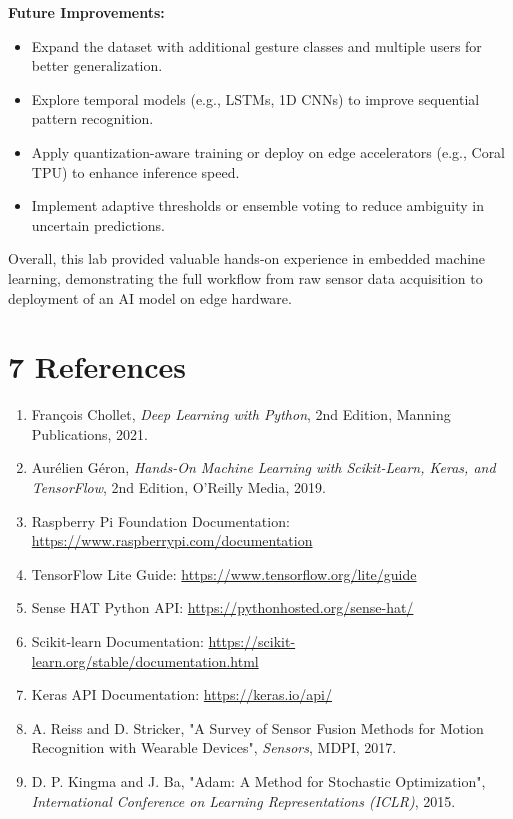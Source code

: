 \documentclass[a4paper,12pt]{article}
\begin{document}
\textbf{Future Improvements:}
\begin{itemize}
    \item Expand the dataset with additional gesture classes and multiple users for better generalization.
    \item Explore temporal models (e.g., LSTMs, 1D CNNs) to improve sequential pattern recognition.
    \item Apply quantization-aware training or deploy on edge accelerators (e.g., Coral TPU) to enhance inference speed.
    \item Implement adaptive thresholds or ensemble voting to reduce ambiguity in uncertain predictions.
\end{itemize}

Overall, this lab provided valuable hands-on experience in embedded machine learning, demonstrating the full workflow from raw sensor data acquisition to deployment of an AI model on edge hardware.

\section*{7 References}
\begin{enumerate}
    \item François Chollet, \textit{Deep Learning with Python}, 2nd Edition, Manning Publications, 2021.
    \item Aurélien Géron, \textit{Hands-On Machine Learning with Scikit-Learn, Keras, and TensorFlow}, 2nd Edition, O'Reilly Media, 2019.
    \item Raspberry Pi Foundation Documentation: \url{https://www.raspberrypi.com/documentation}
    \item TensorFlow Lite Guide: \url{https://www.tensorflow.org/lite/guide}
    \item Sense HAT Python API: \url{https://pythonhosted.org/sense-hat/}
    \item Scikit-learn Documentation: \url{https://scikit-learn.org/stable/documentation.html}
    \item Keras API Documentation: \url{https://keras.io/api/}
    \item A. Reiss and D. Stricker, "A Survey of Sensor Fusion Methods for Motion Recognition with Wearable Devices", \textit{Sensors}, MDPI, 2017.
    \item D. P. Kingma and J. Ba, "Adam: A Method for Stochastic Optimization", \textit{International Conference on Learning Representations (ICLR)}, 2015.
\end{enumerate}
\end{document}
